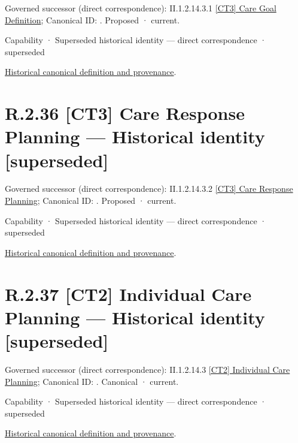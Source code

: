 {\small Governed successor (direct correspondence): II.1.2.14.3.1 \hyperref[element:609e1bef516b44bb976b5dbebe7f684b]{[CT3] Care Goal Definition}; Canonical ID: \texttt{}. Proposed · current.}\par
\label{element:8bfbcc0a455d423c90ae2f1cfb732ca8}
{\small Capability · Superseded historical identity — direct correspondence · superseded}\par
\href{../../../../continuum/strategy/capability/8bfbcc0a455d423c90ae2f1cfb732ca8.md}{Historical canonical definition and provenance}.\par
\section*{R.2.36 [CT3] Care Response Planning — Historical identity [superseded]}
\label{navigation:R.2.36}

{\small Governed successor (direct correspondence): II.1.2.14.3.2 \hyperref[element:2636e43903e44a97ad5b8db32692ce8b]{[CT3] Care Response Planning}; Canonical ID: \texttt{}. Proposed · current.}\par
\label{element:d64569acaf2c44f3b2a5332f74fff7c7}
{\small Capability · Superseded historical identity — direct correspondence · superseded}\par
\href{../../../../continuum/strategy/capability/d64569acaf2c44f3b2a5332f74fff7c7.md}{Historical canonical definition and provenance}.\par
\section*{R.2.37 [CT2] Individual Care Planning — Historical identity [superseded]}
\label{navigation:R.2.37}

{\small Governed successor (direct correspondence): II.1.2.14.3 \hyperref[element:f036a9866459429a8fb5f5e10727b5e8]{[CT2] Individual Care Planning}; Canonical ID: \texttt{}. Canonical · current.}\par
\label{element:574e61e230e643f78c58649adb4db313}
{\small Capability · Superseded historical identity — direct correspondence · superseded}\par
\href{../../../../continuum/strategy/capability/574e61e230e643f78c58649adb4db313.md}{Historical canonical definition and provenance}.\par
